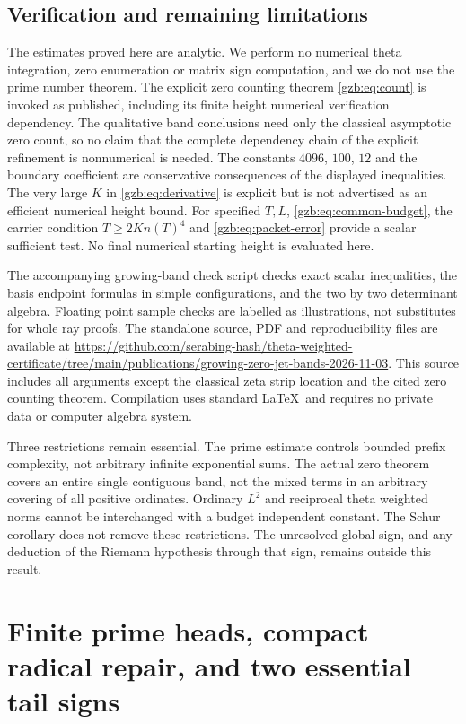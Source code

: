 \documentclass[11pt,a4paper]{article}
\numberwithin{equation}{section}
\theoremstyle{definition}\newtheorem{definition}[theorem]{Definition}
\theoremstyle{remark}\newtheorem{remark}[theorem]{Remark}
\begin{document}
\subsection{Verification and remaining limitations}
The estimates proved here are analytic. We perform no numerical theta
integration, zero enumeration or matrix sign computation, and we do not
use the prime number theorem. The explicit zero counting theorem
\eqref{gzb:eq:count} is invoked as published, including its finite height
numerical verification dependency. The qualitative band conclusions need
only the classical asymptotic zero count, so no claim that the complete
dependency chain of the explicit refinement is nonnumerical is needed.
The constants $4096$, $100$, $12$ and the boundary coefficient are
conservative consequences of the displayed inequalities.
The very large $K$ in \eqref{gzb:eq:derivative} is explicit but is not
advertised as an efficient numerical height bound.
For specified $T,L$, \eqref{gzb:eq:common-budget}, the carrier condition
$T\ge2Kn(T)^4$ and \eqref{gzb:eq:packet-error} provide a scalar sufficient
test. No final numerical starting height is evaluated here.

The accompanying growing-band check script checks exact scalar inequalities, the basis
endpoint formulas in simple configurations, and the two by two determinant
algebra. Floating point sample checks are labelled as illustrations,
not substitutes for whole ray proofs.
The standalone source, PDF and reproducibility files are available at
\url{https://github.com/serabing-hash/theta-weighted-certificate/tree/main/publications/growing-zero-jet-bands-2026-11-03}.
This source includes all arguments except the classical zeta strip
location and the cited zero counting theorem. Compilation uses standard \LaTeX\ and requires no
private data or computer algebra system.

Three restrictions remain essential. The prime estimate controls bounded
prefix complexity, not arbitrary infinite exponential sums.
The actual zero theorem covers an entire single contiguous band, not
the mixed terms in an arbitrary covering of all positive ordinates.
Ordinary $L^2$ and reciprocal theta weighted norms cannot be interchanged
with a budget independent constant. The Schur corollary does not remove
these restrictions. The unresolved global sign, and any deduction of
the Riemann hypothesis through that sign, remains outside this result.




\section{Finite prime heads, compact radical repair, and two essential tail signs}
\label{vfourA:sec:prime-obstruction}
\end{document}
